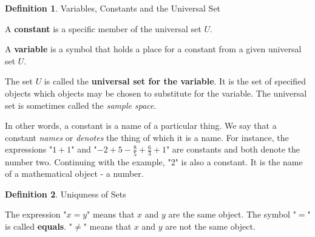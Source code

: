 \documentclass{book}
\theoremstyle{definition}
\newtheorem{definition}{Definition}[section]
\theoremstyle{remark}
\begin{document}
\begin{definition}
Variables, Constants and the Universal Set \\

    \begin{tcolorbox}
        A {\bf constant} is a specific member of the universal set $U$.
    \end{tcolorbox}
    
    \begin{tcolorbox}
        A {\bf variable} is a symbol that holds a place for a constant from a given universal set $U$.
    \end{tcolorbox}

    \begin{tcolorbox}
        The set $U$ is called the {\bf universal set for the variable}. It is the set of specified objects which objects may be chosen to substitute for the variable. The universal set is sometimes called the {\it sample space}.
    \end{tcolorbox}
    
    In other words, a constant is a name of a particular thing. We say that a constant \textit{names} or \textit{denotes} the thing of which it is a name. For instance, the expressions "$1 + 1$" and "$-2 + 5 - \frac{8}{5} + \frac{6}{3} + 1$" are constants and both denote the number two. Continuing with the example, "$2$" is also a constant. It is the name of a mathematical object - a number.
\end{definition}


\newpage
\begin{definition}
Uniquness of Sets  \\

    \begin{tcolorbox}
        The expression "$x=y$" means that $x$ and $y$ are the same object. The symbol "$=$" is called \textbf{equals}. "$\neq$" means that $x$ and $y$ are not the same object.         
    \end{tcolorbox}
\end{definition}
\end{document}
